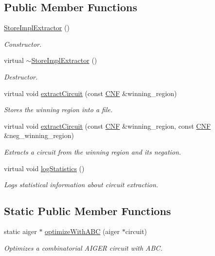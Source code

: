\subsection*{Public Member Functions}
\begin{DoxyCompactItemize}
\item 
\hyperlink{classStoreImplExtractor_ab52feee236cb70953d9723c676601fb1}{Store\-Impl\-Extractor} ()
\begin{DoxyCompactList}\small\item\em Constructor. \end{DoxyCompactList}\item 
virtual \hyperlink{classStoreImplExtractor_ad617c7ffdeee1ddaec668b55deb4dc03}{$\sim$\-Store\-Impl\-Extractor} ()
\begin{DoxyCompactList}\small\item\em Destructor. \end{DoxyCompactList}\item 
virtual void \hyperlink{classStoreImplExtractor_a08437db801013d0b3208bbf099239fac}{extract\-Circuit} (const \hyperlink{classCNF}{C\-N\-F} \&winning\-\_\-region)
\begin{DoxyCompactList}\small\item\em Stores the winning region into a file. \end{DoxyCompactList}\item 
virtual void \hyperlink{classCNFImplExtractor_a5e9694425af3f1a76d8b21ace3c435d9}{extract\-Circuit} (const \hyperlink{classCNF}{C\-N\-F} \&winning\-\_\-region, const \hyperlink{classCNF}{C\-N\-F} \&neg\-\_\-winning\-\_\-region)
\begin{DoxyCompactList}\small\item\em Extracts a circuit from the winning region and its negation. \end{DoxyCompactList}\item 
virtual void \hyperlink{classCNFImplExtractor_aae098749e201b22294a70f6e0a4a58f0}{log\-Statistics} ()
\begin{DoxyCompactList}\small\item\em Logs statistical information about circuit extraction. \end{DoxyCompactList}\end{DoxyCompactItemize}
\subsection*{Static Public Member Functions}
\begin{DoxyCompactItemize}
\item 
static aiger $\ast$ \hyperlink{classCNFImplExtractor_ad21828d816dfdbf672f6e595589ef6e7}{optimize\-With\-A\-B\-C} (aiger $\ast$circuit)
\begin{DoxyCompactList}\small\item\em Optimizes a combinatorial A\-I\-G\-E\-R circuit with A\-B\-C. \end{DoxyCompactList}\end{DoxyCompactItemize}

